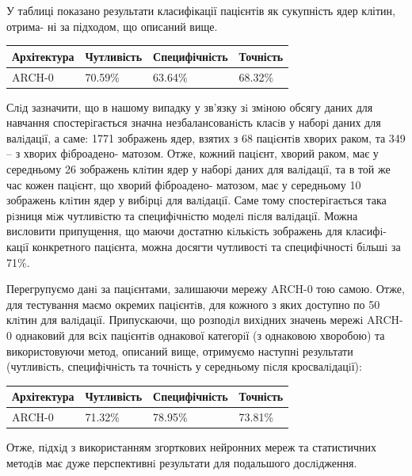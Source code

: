 У таблиці показано результати класифікації пацієнтів як сукупність ядер клітин, отрима- ні за підходом, що описаний вище.

\begin{center}
	\begin{tabular}
		{| m{3cm} || m{3cm} | m{3cm} | m{3cm} |}
		\hline
		Архітектура & Чутливість & Специфічність & Точність \\ \hline \hline
		ARCH-0 & 70.59\%  & 63.64\%  & 68.32\%  \\ \hline
	\end{tabular}
\end{center}

Слiд зазначити, що в нашому випадку у зв'язку зi змiною обсягу даних для навчання спостерiгається значна незбалансованiсть класiв у наборi даних для валiдацiї, а саме: 1771 зображень ядер, взятих з 68 пацiєнтiв хворих раком, та 349 -- з хворих фiброадено- матозом. Отже, кожний пацiєнт, хворий раком, має у середньому 26 зображень клiтин ядер у наборi даних для валiдацiї, та в той же час кожен пацiєнт, що хворий фiброадено- матозом, має у середньому 10 зображень клiтин ядер у вибiрцi для валiдацiї. Саме тому спостерiгається така рiзниця мiж чутливiстю та специфiчнiстю моделi пiсля валiдацiї. Можна висловити припущення, що маючи достатню кiлькiсть зображень для класифi- кацiї конкретного пацiєнта, можна досягти чутливостi та специфiчностi бiльшi за 71\%.

Перегрупуємо данi за пацiєнтами, залишаючи мережу ARCH-0 тою самою. Отже, для тестування маємо окремих пацiєнтiв, для кожного з яких доступно по 50 клiтин для валiдацiї. Припускаючи, що розподiл вихiдних значень мережi ARCH-0 однаковий для всiх пацiєнтiв однакової категорiї (з однаковою хворобою) та використовуючи метод, описаний вище, отримуємо наступнi результати (чутливiсть, специфiчнiсть та точнiсть у середньому пiсля кросвалiдацiї):

\begin{center}
	\begin{tabular}
		{| m{3cm} || m{3cm} | m{3cm} | m{3cm} |}
		\hline
		Архітектура & Чутливість & Специфічність & Точність \\ \hline \hline
		ARCH-0 & 71.32\%  & 78.95\%  & 73.81\%  \\ \hline
	\end{tabular}
\end{center}

Отже, пiдхiд з використанням згорткових нейронних мереж та статистичних методiв має дуже перспективнi результати для подальшого дослiдження.